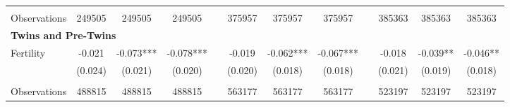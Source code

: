 \begin{table}[htpb!]
\begin{center}
{\begin{tabular}{lcccp{2mm}cccp{2mm}ccc}
\begin{footnotesize}\end{footnotesize}&\begin{footnotesize}\end{footnotesize}&\begin{footnotesize}\end{footnotesize}&\begin{footnotesize}\end{footnotesize}&\begin{footnotesize}\end{footnotesize}&\begin{footnotesize}\end{footnotesize}&\begin{footnotesize}\end{footnotesize}&\begin{footnotesize}\end{footnotesize}&\begin{footnotesize}\end{footnotesize}&\begin{footnotesize}\end{footnotesize}\\Observations&249505&249505&249505&&375957&375957&375957&&385363&385363&385363\\
\multicolumn{12}{l}{\textbf{Twins and Pre-Twins}}\\ 
Fertility&-0.021&-0.073***&-0.078***&&-0.019&-0.062***&-0.067***&&-0.018&-0.039**&-0.046**\\
&(0.024)&(0.021)&(0.020)&&(0.020)&(0.018)&(0.018)&&(0.021)&(0.019)&(0.018)\\
\begin{footnotesize}\end{footnotesize}&\begin{footnotesize}\end{footnotesize}&\begin{footnotesize}\end{footnotesize}&\begin{footnotesize}\end{footnotesize}&\begin{footnotesize}\end{footnotesize}&\begin{footnotesize}\end{footnotesize}&\begin{footnotesize}\end{footnotesize}&\begin{footnotesize}\end{footnotesize}&\begin{footnotesize}\end{footnotesize}&\begin{footnotesize}\end{footnotesize}\\Observations&488815&488815&488815&&563177&563177&563177&&523197&523197&523197\\
\bottomrule
\end{tabular}}\end{center}\end{table}
